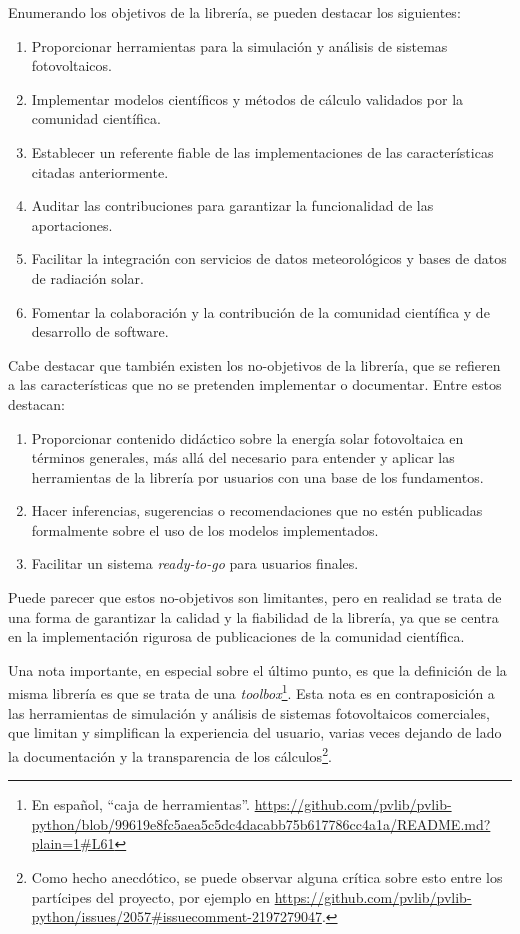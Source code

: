 Enumerando los objetivos de la librería, se pueden destacar los siguientes:

\begin{enumerate}
      \item Proporcionar herramientas para la simulación y análisis de sistemas fotovoltaicos.
      \item Implementar modelos científicos y métodos de cálculo validados por la comunidad científica.
      \item Establecer un referente fiable de las implementaciones de las características citadas anteriormente.
      \item Auditar las contribuciones para garantizar la funcionalidad de las aportaciones.
      \item Facilitar la integración con servicios de datos meteorológicos y bases de datos de radiación solar.
      \item Fomentar la colaboración y la contribución de la comunidad científica y de desarrollo de software.
\end{enumerate}

Cabe destacar que también existen los no-objetivos de la librería, que se refieren a las características que no se pretenden implementar o documentar. Entre estos destacan:

\begin{enumerate}
      \item Proporcionar contenido didáctico sobre la energía solar fotovoltaica en términos generales, más allá del necesario para entender y aplicar las herramientas de la librería por usuarios con una base de los fundamentos.
      \item Hacer inferencias, sugerencias o recomendaciones que no estén publicadas formalmente sobre el uso de los modelos implementados.
      \item Facilitar un sistema \textit{ready-to-go} para usuarios finales.
\end{enumerate}

Puede parecer que estos no-objetivos son limitantes, pero en realidad se trata de una forma de garantizar la calidad y la fiabilidad de la librería, ya que se centra en la implementación rigurosa de publicaciones de la comunidad científica.

Una nota importante, en especial sobre el último punto, es que la definición de la misma librería es que se trata de una \textit{toolbox}\footnote{En español, ``caja de herramientas''. \url{https://github.com/pvlib/pvlib-python/blob/99619e8fc5aea5c5dc4dacabb75b617786cc4a1a/README.md?plain=1\#L61}}. Esta nota es en contraposición a las herramientas de simulación y análisis de sistemas fotovoltaicos comerciales, que limitan y simplifican la experiencia del usuario, varias veces dejando de lado la documentación y la transparencia de los cálculos\footnote{Como hecho anecdótico, se puede observar alguna crítica sobre esto entre los partícipes del proyecto, por ejemplo en \url{https://github.com/pvlib/pvlib-python/issues/2057\#issuecomment-2197279047}.}.

